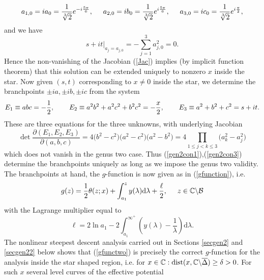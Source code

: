 \documentclass[10pt,oneside,reqno]{amsart}
\numberwithin{equation}{section}
\renewcommand{\d}{{\mathrm d}}
\def\eqref#1{(\ref{#1})}
\begin{document}
\begin{equation*}
  a_{1,0}=ia_0=\frac{1}{\sqrt[3]{2}}e^{-i\frac{5\pi}{6}},\hspace{0.5cm} a_{2,0}=ib_0=\frac{1}{\sqrt[3]{2}}e^{i\frac{5\pi}{6}},\hspace{0.5cm} a_{3,0}=ic_0=\frac{1}{\sqrt[3]{2}}e^{i\frac{\pi}{2}},
\end{equation*}
and we have
\begin{equation*}
  s+it\Big|_{a_j=a_{j,0}}=-\sum_{j=1}^3a_{j,0}^2 =0.
\end{equation*}
Hence the non-vanishing of the Jacobian \eqref{Jac} implies (by implicit function theorem) that this solution can be extended uniquely to nonzero $x$ inside the star. Now given
$(s,t)$ corresponding to $x\neq 0$ inside the star, we determine the branchpoints $\pm ia,\pm ib,\pm ic$ from the system
\begin{equation*}
  E_1\equiv abc=-\frac{1}{2},\hspace{0.75cm}E_2\equiv a^2b^2+a^2c^2+b^2c^2=-\frac{x}{2},\hspace{0.75cm}E_3\equiv a^2+b^2+c^2=s+it.
\end{equation*}
These are three equations for the three unknowns, with underlying Jacobian
\begin{equation*}
 \det\frac{\partial(E_1,E_2,E_3)}{\partial(a,b,c)} = 4\big(b^2-c^2\big)\big(a^2-c^2\big)\big(a^2-b^2\big)=4\!\!\!\!\!\prod_{1\leq j<k\leq 3}\!\!\!\big(a_k^2-a_j^2\big)
\end{equation*}
which does not vanish in the genus two case. Thus \eqref{gen2con1},\eqref{gen2con3} determine the branchpoints uniquely as long as we impose the genus two validity. The branchpoints at hand, the $g$-function is now given as in \eqref{gfunction}, i.e.
\begin{equation}\label{gfunctwo}
 g(z) = \frac{1}{2}\theta(z;x)+\int_{a_1}^zy(\lambda)\d\lambda+\frac{\ell}{2},\hspace{0.5cm}z\in\mathbb{C}\backslash\mathcal{B}
\end{equation}
with the Lagrange multiplier equal to
\begin{equation}\label{Lagra2}
  \ell = 2\ln a_1-2\int_{a_1}^{\infty^+}\left(y(\lambda)-\frac{1}{\lambda}\right)\d\lambda.
\end{equation}
The nonlinear steepest descent analysis carried out in Sections \ref{secgen2} and \ref{secgen22} below shows that \eqref{gfunctwo} is precisely the correct $g$-function for the analysis inside the
star shaped region, i.e. for $x\in\mathbb{C}:\textnormal{dist}(x,\mathbb{C}\backslash\overline\Delta)\geq\delta>0$. For such $x$ several level curves of the effective potential
\end{document}
